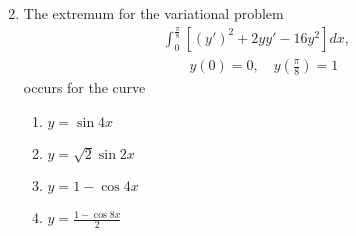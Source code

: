 \documentclass[journal,12pt,twocolumn]{IEEEtran}
\theoremstyle{remark}
\begin{document}
\begin{enumerate}
\begin{multicols}{2}
\end{multicols}
\item The extremum for the variational problem
\begin{align*}
    \int_{0}^{\frac{\pi}{8}} \left[ (y')^2 + 2yy' - 16y^2 \right] dx, \quad 
\end{align*}
\begin{align*}
    y(0)=0,\quad y\left(\frac{\pi}{8}\right)=1
\end{align*}
occurs for the curve
\begin{multicols}{2}
    \begin{enumerate}
        \item $y=\sin{4x}$
        \item $y=\sqrt{2}\sin{2x}$
        \item $y=1-\cos{4x}$
        \item $y=\frac{1-\cos{8x}}{2}$
    \end{enumerate}
\end{multicols}
\end{enumerate}
\end{document}
